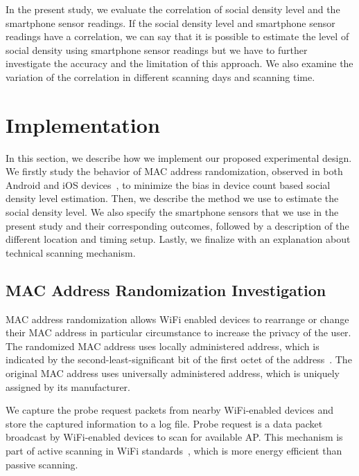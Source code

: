 In the present study, we evaluate the correlation of social density level and the smartphone sensor readings. If the social density level and smartphone sensor readings have a correlation, we can say that it is possible to estimate the level of social density using smartphone sensor readings but we have to further investigate the accuracy and the limitation of this approach. We also examine the variation of the correlation in different scanning days and scanning time.











\section{Implementation} %
\label{sec:implementation}
In this section, we describe how we implement our proposed experimental design. We firstly study the behavior of \ac{MAC} address randomization, observed in both Android and iOS devices~\cite{thesis061}, to minimize the bias in device count based social density level estimation. Then, we describe the method we use to estimate the social density level. We also specify the smartphone sensors that we use in the present study and their corresponding outcomes, followed by a description of the different location and timing setup. Lastly, we finalize with an explanation about technical scanning mechanism.

\subsection{MAC Address Randomization Investigation} %
\label{sub:mac_address_randomization_investigation}
\ac{MAC} address randomization allows WiFi enabled devices to rearrange or change their \ac{MAC} address in particular circumstance to increase the privacy of the user. The randomized \ac{MAC} address uses locally administered address, which is indicated by the second-least-significant bit of the first octet of the address~\cite{thesis082}. The original \ac{MAC} address uses universally administered address, which is uniquely assigned by its manufacturer.

We capture the probe request packets from nearby WiFi-enabled devices and store the captured information to a log file. Probe request is a data packet broadcast by WiFi-enabled devices to scan for available \ac{AP}. This mechanism is part of active scanning in WiFi standards~\cite{thesis082}, which is more energy efficient than passive scanning.

